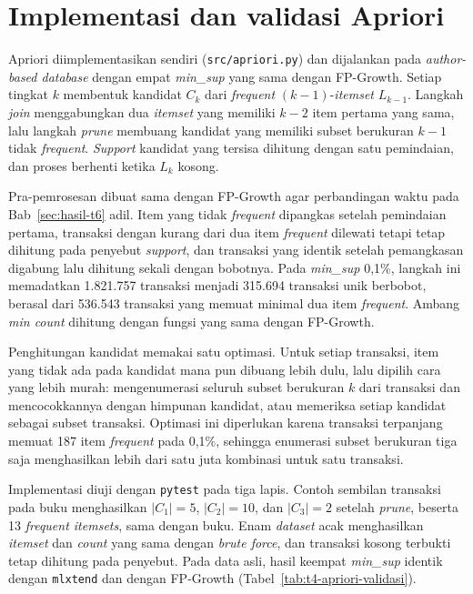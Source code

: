 \section{Implementasi dan validasi Apriori}
\label{sec:hasil-t4-apriori}
Apriori \cite{agrawal1994} diimplementasikan sendiri (\texttt{src/apriori.py}) dan dijalankan pada \textit{author-based database} dengan empat \textit{min\_sup} yang sama dengan FP-Growth. Setiap tingkat $k$ membentuk kandidat $C_k$ dari \textit{frequent} $(k-1)$-\textit{itemset} $L_{k-1}$. Langkah \textit{join} menggabungkan dua \textit{itemset} yang memiliki $k-2$ item pertama yang sama, lalu langkah \textit{prune} membuang kandidat yang memiliki subset berukuran $k-1$ tidak \textit{frequent}. \textit{Support} kandidat yang tersisa dihitung dengan satu pemindaian, dan proses berhenti ketika $L_k$ kosong.

Pra-pemrosesan dibuat sama dengan FP-Growth agar perbandingan waktu pada Bab~\ref{sec:hasil-t6} adil. Item yang tidak \textit{frequent} dipangkas setelah pemindaian pertama, transaksi dengan kurang dari dua item \textit{frequent} dilewati tetapi tetap dihitung pada penyebut \textit{support}, dan transaksi yang identik setelah pemangkasan digabung lalu dihitung sekali dengan bobotnya. Pada \textit{min\_sup} 0,1\%, langkah ini memadatkan 1.821.757 transaksi menjadi 315.694 transaksi unik berbobot, berasal dari 536.543 transaksi yang memuat minimal dua item \textit{frequent}. Ambang \textit{min count} dihitung dengan fungsi yang sama dengan FP-Growth.

Penghitungan kandidat memakai satu optimasi. Untuk setiap transaksi, item yang tidak ada pada kandidat mana pun dibuang lebih dulu, lalu dipilih cara yang lebih murah: mengenumerasi seluruh subset berukuran $k$ dari transaksi dan mencocokkannya dengan himpunan kandidat, atau memeriksa setiap kandidat sebagai subset transaksi. Optimasi ini diperlukan karena transaksi terpanjang memuat 187 item \textit{frequent} pada 0,1\%, sehingga enumerasi subset berukuran tiga saja menghasilkan lebih dari satu juta kombinasi untuk satu transaksi.

Implementasi diuji dengan \texttt{pytest} pada tiga lapis. Contoh sembilan transaksi pada buku \textcite{han2012} menghasilkan $|C_1| = 5$, $|C_2| = 10$, dan $|C_3| = 2$ setelah \textit{prune}, beserta 13 \textit{frequent itemsets}, sama dengan buku. Enam \textit{dataset} acak menghasilkan \textit{itemset} dan \textit{count} yang sama dengan \textit{brute force}, dan transaksi kosong terbukti tetap dihitung pada penyebut. Pada data asli, hasil keempat \textit{min\_sup} identik dengan \texttt{mlxtend} dan dengan FP-Growth (Tabel~\ref{tab:t4-apriori-validasi}).

